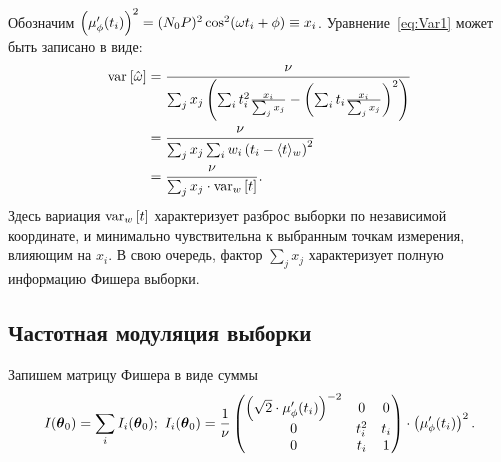 Обозначим ${\bkt{\mupp}^2 = (N_0P)^2\cos^2(\w t_i + \phi) \equiv x_i}$. 
Уравнение~\eqref{eq:Var1} может быть записано в виде:
\begin{align}
\var{\hat\w} &= \frac{\nu}{\sum_j x_j \bkt{\sum_i t_i^2 \frac{x_i}{\sum_j x_j} - \bkt{\sum_i t_i \frac{x_i}{\sum_j x_j}}^2}} \notag\\
&= \frac{\nu}{\sum_j x_j \sum_i w_i\bkt{t_i - \avg{t}[w]}^2} \notag\\
&= \frac{\nu}{\sum_j x_j \cdot\var[w]{t}}. \label{eq:Var2}
\end{align}
Здесь вариация $\var[w]{t}$ характеризует разброс выборки по независимой координате, 
и минимально чувствительна к выбранным точкам измерения, влияющим на $x_i$. В свою очередь, 
фактор $\sum_jx_j$ характеризует полную информацию Фишера выборки. 


\subsection{Частотная модуляция выборки}
Запишем матрицу Фишера в виде суммы
\begin{equation}\label{eq:FisherSum}
\Fisher = \sum_i \Fisher[i]; 
~\Fisher[i] = \frac1\nu\begin{pmatrix}
\bkt{\sqrt2\cdot\mupp}^{-2} & 0 		& 0 \\
0		 & t_i^2 	& t_i \\
0		 &	t_i	    & 1
\end{pmatrix}\cdot\bkt{\mupp}^2.
\end{equation}

